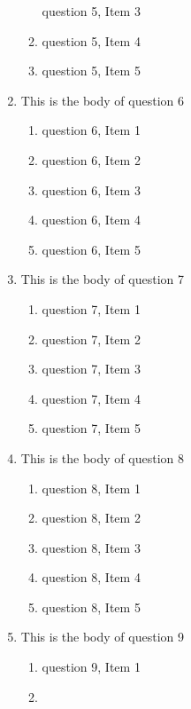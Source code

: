 \documentclass{article}
\begin{document}
\begin{enumerate}
\begin{enumerate}
    question 5, Item 3
    \item
    question 5, Item 4
    \item
    question 5, Item 5
    \end{enumerate}
\item
This is the body of question 6
    \begin{enumerate}
    \item
    question 6, Item 1
    \item
    question 6, Item 2
    \item
    question 6, Item 3
    \item
    question 6, Item 4
    \item
    question 6, Item 5
    \end{enumerate}
\item
This is the body of question 7
    \begin{enumerate}
    \item
    question 7, Item 1
    \item
    question 7, Item 2
    \item
    question 7, Item 3
    \item
    question 7, Item 4
    \item
    question 7, Item 5
    \end{enumerate}
\item
This is the body of question 8
    \begin{enumerate}
    \item
    question 8, Item 1
    \item
    question 8, Item 2
    \item
    question 8, Item 3
    \item
    question 8, Item 4
    \item
    question 8, Item 5
    \end{enumerate}
\item
This is the body of question 9
    \begin{enumerate}
    \item
    question 9, Item 1
    \item

\end{enumerate}
\end{enumerate}
\end{document}
